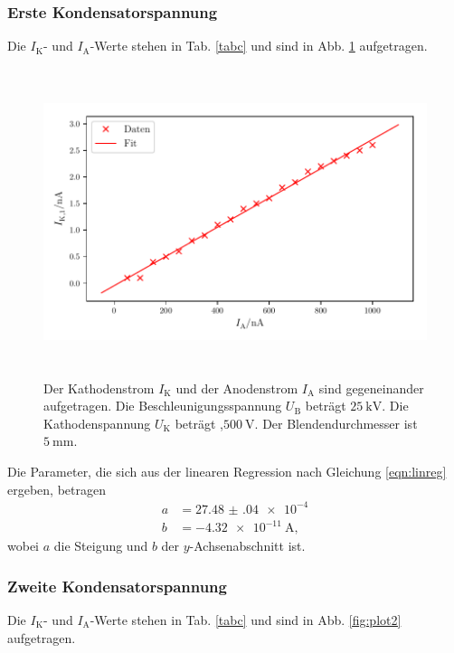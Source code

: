 \subsubsection{Erste Kondensatorspannung}
Die $I_\text{K}$- und $I_\text{A}$-Werte stehen in Tab. \ref{tabc} und sind in Abb. \ref{fig:plot1} aufgetragen. 



\begin{figure}
    \centering
    \includegraphics[width=15cm, height=9cm]{build/plot1.pdf}
    \caption{Der Kathodenstrom $I_\text{K}$ und der Anodenstrom $I_\text{A}$ sind gegeneinander aufgetragen. Die Beschleunigungsspannung $U_\text{B}$ beträgt $\SI{25}{\kilo\volt}$. Die Kathodenspannung $U_\text{K}$ beträgt ,$\SI{500}{\volt}$. Der Blendendurchmesser ist $\SI{5}{\milli\meter}.$}
    \label{fig:plot1}
\end{figure}

\noindent Die Parameter, die sich aus der linearen Regression nach Gleichung \eqref{eqn:linreg} ergeben, betragen
\begin{align*}
    a &= \num{27.48(04)e-4}\\
    b &= \SI{-4.32e-11}{\ampere},
\end{align*}
wobei $a$ die Steigung und $b$ der $y$-Achsenabschnitt ist. 

\subsubsection{Zweite Kondensatorspannung}
Die $I_\text{K}$- und $I_\text{A}$-Werte stehen in Tab. \ref{tabc} und sind in Abb. \ref{fig:plot2} aufgetragen. 

